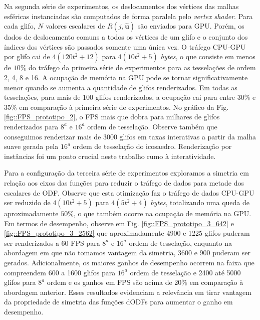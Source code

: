 Na segunda série de experimentos, os deslocamentos dos vértices das malhas esféricas instanciadas são computados de forma paralela pelo \textit{vertex shader}. Para cada glifo, $N$ valores escalares de $R(j, \mathbf{\hat{u}})$ são enviados para GPU. Porém, os dados de deslocamento comuns a todos os vértices de um glifo e o conjunto dos índices dos vértices são passados somente uma única vez. O tráfego CPU-GPU por glifo cai de $4(120t^2 + 12)$ para $4(10t^2 + 5)$ \textit{bytes}, o que consiste em menos de $10\%$ do tráfego da primeira série de experimentos para as tesselações de ordem 2, 4, 8 e 16. A ocupação de memória na GPU pode se tornar significativamente menor quando se aumenta a quantidade de glifos renderizados. Em todas as tesselações, para mais de 100 glifos renderizados, a ocupação cai para entre 30\% e 35\% em comparação à primeira série de experimentos. No gráfico da Fig. \ref{fig::FPS_prototipo_2}, o FPS mais que dobra para milhares de glifos renderizados para $8^a$ e $16^a$ ordem de tesselação. Observe também que conseguimos renderizar mais de 3000 glifos em taxas interativas \cite{nielsen1994} a partir da malha suave gerada pela $16^a$ ordem de tesselação do icosaedro. Renderização por instâncias foi um ponto crucial neste trabalho rumo à interatividade.

Para a configuração da terceira série de experimentos exploramos a simetria em relação aos eixos das funções para reduzir o tráfego de dados para metade dos escalares de ODF.
Observe que esta otimização faz o tráfego de dados CPU-GPU ser reduzido de $4(10t^2 + 5)$  para $4(5t^2 + 4)$ \textit{bytes}, totalizando uma queda de aproximadamente $50\%$, o que também ocorre na ocupação de memória na GPU. Em termos de desempenho, observe em Fig. \ref{fig::FPS_prototipo_3_642} e \ref{fig::FPS_prototipo_3_2562} que aproximadamente 4900 e 1225 glifos puderam ser renderizados a 60 FPS para $8^a$ e $16^a$ ordem de tesselação, enquanto na abordagem em que não tomamos vantagem da simetria, 3600 e 900 puderam ser gerados. Adicionalmente, os maiores ganhos de desempenho ocorrem na faixa que compreendem 600 a 1600 glifos para $16^a$ ordem de tesselação e 2400 até 5000 glifos para $8^a$ ordem e os ganhos em FPS são acima de 20\% em comparação à abordagem anterior. Esses resultados evidenciam a relevância em tirar vantagem da propriedade de simetria das funções dODFs para aumentar o ganho em desempenho.

